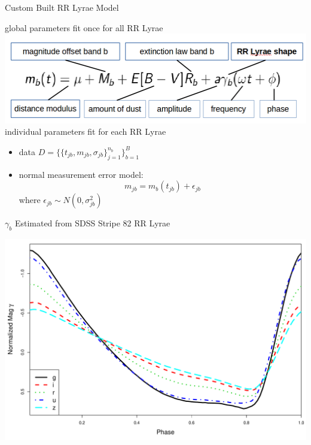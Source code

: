 \documentclass[12pt]{beamer}
\begin{document}
\begin{frame}{Custom Built RR Lyrae Model}


\begin{center}
global parameters fit once for all RR Lyrae\\
\includegraphics[scale=.3]{figs/model.png}\\
individual parameters fit for each RR Lyrae
\end{center}

\vspace{.2in}

\begin{itemize}
\item data $D=\{\{t_{jb},m_{jb},\sigma_{jb}\}_{j=1}^{n_b}\}_{b=1}^B$
\item normal measurement error model:
\begin{equation*}
m_{jb} = m_b(t_{jb}) + \epsilon_{jb}
\end{equation*}
where $\epsilon_{jb} \sim N(0,\sigma_{jb}^2)$
\end{itemize}
\end{frame}

\begin{frame}{$\gamma_b$ Estimated from SDSS Stripe 82 RR Lyrae}

\begin{center}
\includegraphics[scale=.3]{figs/templates.pdf}
\end{center}

\end{frame}
\end{document}
